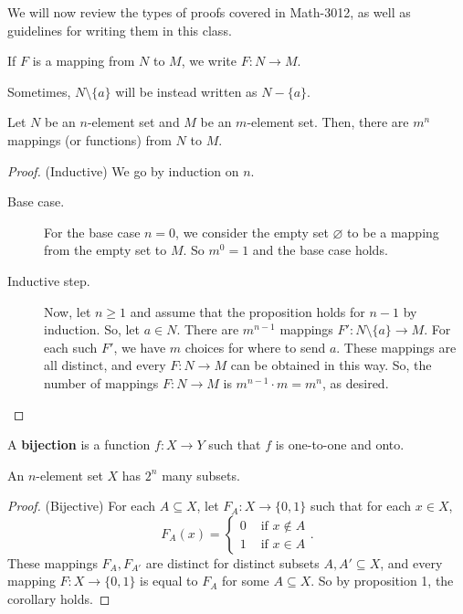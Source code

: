 
We will now review the types of proofs covered in Math-3012, as well as guidelines for writing them in this class.

\begin{notation}
	If \( F \) is a mapping from \( N \) to \( M \), we write \( F: N \to M \).
\end{notation}

\begin{notation}
	Sometimes, \( N \setminus \{a\}   \) will be instead written as \( N-\{a\}   \).
\end{notation}

\begin{prop}
	Let \( N \) be an \( n \)-element set and \( M \) be an \( m \)-element set. Then, there are \( m^n \) mappings (or functions) from \( N \) to \( M \).
\end{prop}
\begin{proof}
	(Inductive) We go by induction on \( n \). 
	\begin{description}
		\item[Base case.] For the base case \( n=0 \), we consider the empty set \( \varnothing \) to be a mapping from the empty set to \( M \). So \( m^0=1 \) and the base case holds. 
		\item[Inductive step.] Now, let \( n\ge 1 \) and assume that the proposition holds for \( n-1 \) by induction. So, let \( a \in N \). There are \( m^{n-1}  \) mappings \( F' : N \setminus \{a\} \to M  \). For each such \( F' \), we have \( m \) choices for where to send \( a \). These mappings are all distinct, and every \( F:N \to M \) can be obtained in this way. So, the number of mappings \( F : N \to M \) is \( m^{n-1}\cdot m  = m^n\), as desired.
	\end{description}
\end{proof}

\begin{definition}
	A \textbf{bijection} is a function \( f : X \to Y \) such that \( f \) is one-to-one and onto.
\end{definition}

\begin{corollary}
	An \( n \)-element set \( X \) has \( 2^n \) many subsets.
\end{corollary}
\begin{proof}
	(Bijective) For each \( A \subseteq X \), let \( F_A : X \to \{0,1\}   \) such that for each \( x \in X \), 
	\[ F_A(x)=
		\begin{cases}
			0 &\text{ if }x \not\in A\\
			1 &\text{ if }x \in A
		\end{cases} 
	.\] These mappings \( F_A,F_{A'} \) are distinct for distinct subsets \( A,A' \subseteq X \), and every mapping \( F:X \to \{0,1\}   \) is equal to \( F_A \)  for some \( A \subseteq X \). So by proposition 1, the corollary holds.
\end{proof}

